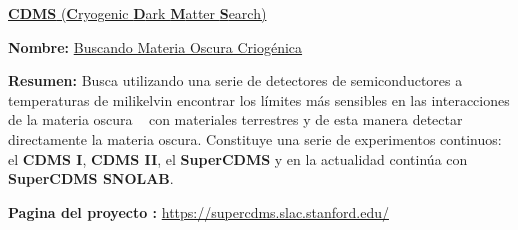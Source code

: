 \begin{itemize_f}

\item[-] \href{https://en.wikipedia.org/wiki/Cryogenic_Dark_Matter_Search}{\textbf{CDMS} (\textbf{C}ryogenic \textbf{D}ark \textbf{M}atter \textbf{S}earch)}
\begin{itemize_f}
\item \textbf{Nombre:} \href{https://en.wikipedia.org/wiki/Cryogenic_Dark_Matter_Search}{Buscando Materia Oscura Criogénica}
\item \textbf{Resumen:} Busca utilizando una serie de detectores de semiconductores a temperaturas de milikelvin encontrar los límites más sensibles en las interacciones de la materia oscura \WIMP~  con materiales terrestres y de esta manera detectar directamente la materia oscura. Constituye una serie de experimentos continuos: el \textbf{CDMS I}, \textbf{CDMS II}, el \textbf{SuperCDMS} y en la actualidad continúa con \textbf{SuperCDMS SNOLAB}.
\item \textbf{Pagina del proyecto :} \url{https://supercdms.slac.stanford.edu/}
\end{itemize_f}





\end{itemize_f}
